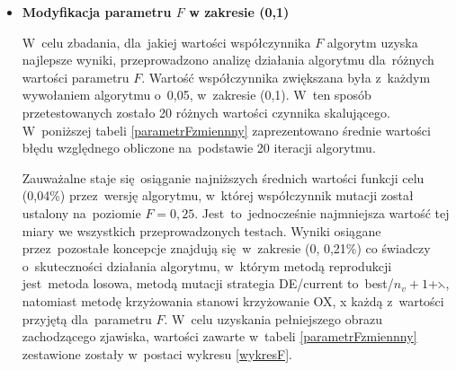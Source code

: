 \begin{itemize}
\item \textbf{Modyfikacja parametru $F$ w zakresie (0,1)}

W~celu zbadania, dla~jakiej wartości współczynnika $F$ algorytm uzyska najlepsze wyniki, przeprowadzono analizę działania algorytmu dla~różnych wartości parametru $F$. Wartość współczynnika zwiększana była z~każdym wywołaniem algorytmu o~0,05, w~zakresie (0,1). W~ten sposób przetestowanych zostało 20 różnych wartości czynnika skalującego. W~poniższej tabeli \ref{parametrFzmiennny} zaprezentowano średnie wartości błędu względnego obliczone na~podstawie 20 iteracji algorytmu.

\begin{table}[h!]
\begin{center}
\caption{Wartości średniego błędu względnego funkcji celu dla algorytmu ze zmiennym parametrem F w zakresie (0,1).}
\label{parametrFzmiennny}
\end{center}
\end{table}

Zauważalne staje się~osiąganie najniższych średnich wartości funkcji celu (0,04\%) przez~wersję algorytmu, w~której współczynnik mutacji został ustalony na~poziomie $F= 0,25$. Jest~to~jednocześnie najmniejsza wartość tej miary we wszystkich przeprowadzonych testach. Wyniki osiągane przez~pozostałe koncepcje znajdują się~w~zakresie (0, 0,21\%) co świadczy o~skuteczności działania algorytmu, w~którym metodą reprodukcji jest~metoda losowa, metodą mutacji strategia DE/current to~best/$n_{v}+1$+$\leftthreetimes$, natomiast metodę krzyżowania stanowi krzyżowanie OX, x każdą z~wartości przyjętą dla~parametru $F$. W~celu uzyskania pełniejszego obrazu zachodzącego zjawiska, wartości zawarte w~tabeli \ref{parametrFzmiennny} zestawione zostały w~postaci wykresu \ref{wykresF}.


\end{itemize}
